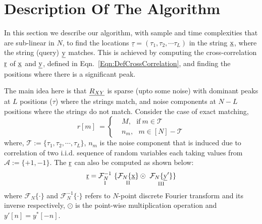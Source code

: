 \section{Description Of The Algorithm}
In this section we describe our algorithm, with sample and time complexities that are sub-linear in $N$, to find the locations $\underline{\tau} = (\tau_1, \tau_2, \cdots \tau_L)$ in the string $\underline{\mathrm{x}}$, where the string (query) $\underline{\mathrm{y}}$ matches. This is achieved by computing the cross-correlation $\underline{\mathrm{r}}$ of $\underline{\mathrm{x}}$ and $\underline{\mathrm{y}}$, defined in Eqn.~\eqref{Eqn:DefCrossCorrelation}, and finding the positions where there is a significant peak. 
%

The main idea here is that $\underline{R_{XY}}$ is sparse (upto some noise) with dominant peaks at $L$ positions ($\tau$) where the strings match, and noise components at $N-L$ positions where the strings do not match. Consider the case of exact matching,
\begin{equation} \label{eqn:RXY_sparse}
r[m] \ = \left\{
\begin{array}{ll}
  &M , \ \ \  \text{if} \ m \in \mathcal{T} \\
  & n_m , \ \ \ m \in [N]-\mathcal{T}
\end{array} 
\right.  
\end{equation}
where, $ \mathcal{T}:=\{\tau_1, \tau_2, \cdots, \tau_L\}$,
 $n_m$ is the noise component that is induced due to correlation of two i.i.d. sequence of random variables each taking values from $\mathcal{A} := \{+1,-1\}$. The $\underline{\mathrm{r}}$ can also be computed as shown below:
\begin{equation}\label{eqn:Rxy_fourier}
  \rv = \underset{\text{ \RNum{1} } } {\mathcal{F}_{N}^{-1}} \ \{ \underset{\text{ \RNum{2} } }{  \mathcal{F}_{N}\{\xv\}}  \odot \ \underset{\text{ \RNum{3} } }{ \mathcal{F}_{N}\{\yv'\}}  \} 
\end{equation} 
where $\mathcal{F}_{N}\{ \cdot \}$ and $\mathcal{F}_{N}^{-1}\{ \cdot \}$ refers to $N$-point discrete Fourier transform and its inverse respectively, $\odot$ is the point-wise multiplication operation and ${ y'[n]} = { y^{*}[-n]}$. 


